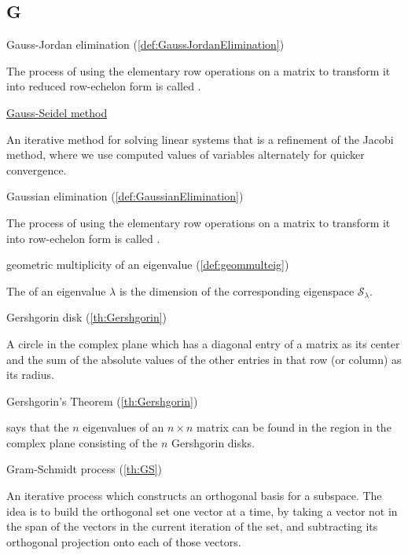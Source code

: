 \documentclass{ximera}
\begin{document}
\subsection*{G}

Gauss-Jordan elimination (\ref{def:GaussJordanElimination})
\begin{expandable}{}{}
    The process of using the elementary row operations on a matrix to transform it into reduced row-echelon form is called .
\end{expandable}

\href{https://ximera.osu.edu/linearalgebradzv3/LinearAlgebraInteractiveIntro/SYS-0040/main}{Gauss-Seidel method}
\begin{expandable}{}{}
    An iterative method for solving linear systems that is a refinement of the Jacobi method, where we use computed values of variables alternately for quicker convergence.
\end{expandable}

Gaussian elimination (\ref{def:GaussianElimination})
\begin{expandable}{}{}
    The process of using the elementary row operations on a matrix to transform it into row-echelon form is called .
\end{expandable}

geometric multiplicity of an eigenvalue (\ref{def:geommulteig})
\begin{expandable}{}{}
    The  of an eigenvalue $\lambda$ is the dimension of the corresponding eigenspace $\mathcal{S}_\lambda$.
\end{expandable}

Gershgorin disk
(\ref{th:Gershgorin})
\begin{expandable}{}{}
    A circle in the complex plane which has a diagonal entry of a matrix as its center and the sum of the absolute values of the other entries in that row (or column) as its radius.
\end{expandable}

Gershgorin's Theorem
(\ref{th:Gershgorin})
\begin{expandable}{}{}
     says that the $n$ eigenvalues of an $n \times n$ matrix can be found in the region in the complex plane consisting of the $n$ Gershgorin disks.
\end{expandable}

Gram-Schmidt process (\ref{th:GS})
\begin{expandable}{}{}
    An iterative process which constructs an orthogonal basis for a subspace. The idea is to build the orthogonal set one vector at a time, by taking a vector not in the span of the vectors in the current iteration of the set, and subtracting its orthogonal projection onto each of those vectors.
\end{expandable}
\end{document}

